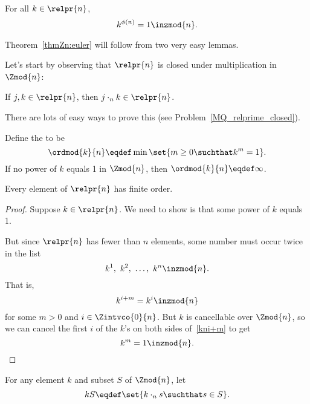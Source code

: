 \begin{theorem}\label{thmZn:euler}
For all $k \in \relpr{n}$,
\begin{equation}\label{eqZn:euler}
    k^{\phi(n)} = 1 \inzmod{n}.
\end{equation}
\end{theorem}

Theorem~\ref{thmZn:euler} will follow from two very easy lemmas.

Let's start by observing that $\relpr{n}$ is closed under
multiplication in $\Zmod{n}$:
\begin{lemma}\label{relprimgroup}
If $j,k \in \relpr{n}$, then $j \cdot_n k \in \relpr{n}$.
\end{lemma}
There are lots of easy ways to prove this (see
Problem~\ref{MQ_relprime_closed}).

\begin{editingnotes}
\begin{definition}
Define the  to be
\[
\ordmod{k}{n} \eqdef \min \set{m \geq 0 \suchthat k^m = 1}.
\]
If no power of $k$ equals 1 in $\Zmod{n}$, then $\ordmod{k}{n} \eqdef
\infty$.
\end{definition}

\begin{lemma}\label{relprime_order}
Every element of $\relpr{n}$ has finite order.

\begin{proof}
Suppose $k \in \relpr{n}$.  We need to show is that some power of $k$
equals 1.

But since $\relpr{n}$ has fewer than $n$ elements, some number must
occur twice in the list
\[
k^1,\ k^2,\ \dots,\ k^n \inzmod{n}.
\] 
That is,
\begin{equation}\label{kni+m}
k^{i+m} = k^{i} \inzmod{n}
\end{equation}
for some $m >0$ and $i \in \Zintvco{0}{n}$.  But $k$ is cancellable over
  $\Zmod{n}$, so we can cancel the first $i$ of the $k$'s on both
  sides of~\eqref{kni+m} to get
\[
k^m =1 \inzmod{n}.
\]
\end{proof}
\end{lemma}
\end{editingnotes}

\begin{definition}\label{def:kS}
For any element $k$ and subset $S$ of $\Zmod{n}$, let
\[
kS \eqdef \set{k \cdot_n s\suchthat s \in S}.
\]
\end{definition}

